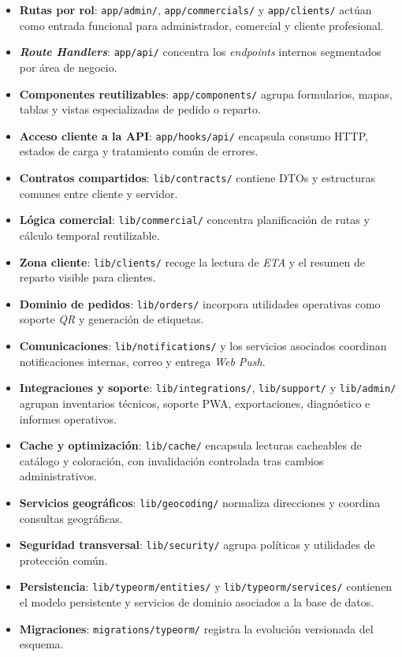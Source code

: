 \begin{itemize}
    \item \textbf{Rutas por rol}: \texttt{app/admin/}, \texttt{app/commercials/} y \texttt{app/clients/} actúan como entrada funcional para administrador, comercial y cliente profesional.
    \item \textbf{\textit{Route Handlers}}: \texttt{app/api/} concentra los \textit{endpoints} internos segmentados por área de negocio.
    \item \textbf{Componentes reutilizables}: \texttt{app/components/} agrupa formularios, mapas, tablas y vistas especializadas de pedido o reparto.
    \item \textbf{Acceso cliente a la API}: \texttt{app/hooks/api/} encapsula consumo HTTP, estados de carga y tratamiento común de errores.
    \item \textbf{Contratos compartidos}: \texttt{lib/contracts/} contiene DTOs y estructuras comunes entre cliente y servidor.
    \item \textbf{Lógica comercial}: \texttt{lib/commercial/} concentra planificación de rutas y cálculo temporal reutilizable.
    \item \textbf{Zona cliente}: \texttt{lib/clients/} recoge la lectura de \textit{ETA} y el resumen de reparto visible para clientes.
    \item \textbf{Dominio de pedidos}: \texttt{lib/orders/} incorpora utilidades operativas como soporte \textit{QR} y generación de etiquetas.
    \item \textbf{Comunicaciones}: \texttt{lib/notifications/} y los servicios asociados coordinan notificaciones internas, correo y entrega \textit{Web Push}.
    \item \textbf{Integraciones y soporte}: \texttt{lib/integrations/}, \texttt{lib/support/} y \texttt{lib/admin/} agrupan inventarios técnicos, soporte PWA, exportaciones, diagnóstico e informes operativos.
    \item \textbf{Cache y optimización}: \texttt{lib/cache/} encapsula lecturas cacheables de catálogo y coloración, con invalidación controlada tras cambios administrativos.
    \item \textbf{Servicios geográficos}: \texttt{lib/geocoding/} normaliza direcciones y coordina consultas geográficas.
    \item \textbf{Seguridad transversal}: \texttt{lib/security/} agrupa políticas y utilidades de protección común.
    \item \textbf{Persistencia}: \texttt{lib/typeorm/entities/} y \texttt{lib/typeorm/services/} contienen el modelo persistente y servicios de dominio asociados a la base de datos.
    \item \textbf{Migraciones}: \texttt{migrations/typeorm/} registra la evolución versionada del esquema.
\end{itemize}

